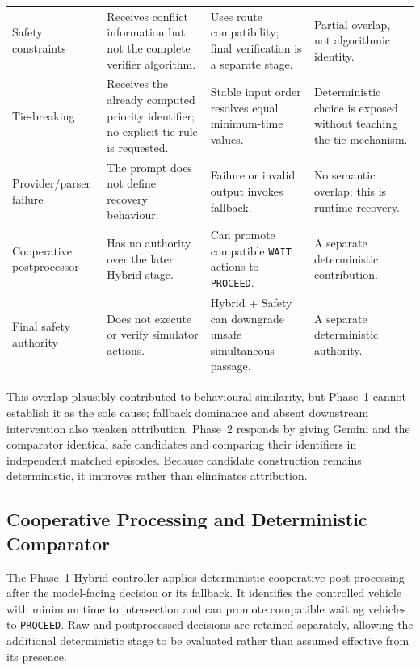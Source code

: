 \documentclass[letterpaper,10pt,conference]{ieeeconf}
\begin{document}
\begin{table}[t]
\begin{tabular}{p{1.9cm} p{3.5cm} p{3.6cm} p{3.2cm}}
Safety constraints & Receives conflict information but not the complete verifier algorithm. & Uses route compatibility; final verification is a separate stage. & Partial overlap, not algorithmic identity. \\

Tie-breaking & Receives the already computed priority identifier; no explicit tie rule is requested. & Stable input order resolves equal minimum-time values. & Deterministic choice is exposed without teaching the tie mechanism. \\

Provider/parser failure & The prompt does not define recovery behaviour. & Failure or invalid output invokes fallback. & No semantic overlap; this is runtime recovery. \\

Cooperative postprocessor & Has no authority over the later Hybrid stage. & Can promote compatible \texttt{WAIT} actions to \texttt{PROCEED}. & A separate deterministic contribution. \\

Final safety authority & Does not execute or verify simulator actions. & Hybrid + Safety can downgrade unsafe simultaneous passage. & A separate deterministic authority. \\

\bottomrule

\end{tabular}

\end{table}



This overlap plausibly contributed to behavioural similarity, but Phase~1 cannot establish it as the sole cause; fallback dominance and absent downstream intervention also weaken attribution. Phase~2 responds by giving Gemini and the comparator identical safe candidates and comparing their identifiers in independent matched episodes. Because candidate construction remains deterministic, it improves rather than eliminates attribution.



\subsection{Cooperative Processing and Deterministic Comparator}



The Phase~1 Hybrid controller applies deterministic cooperative post-processing after the model-facing decision or its fallback. It identifies the controlled vehicle with minimum time to intersection and can promote compatible waiting vehicles to \texttt{PROCEED}. Raw and postprocessed decisions are retained separately, allowing the additional deterministic stage to be evaluated rather than assumed effective from its presence.
\end{document}
